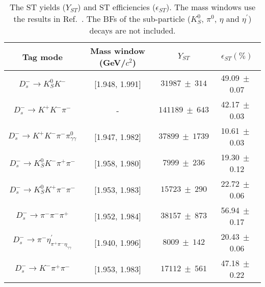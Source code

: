 \documentclass[aps,prd,twocolumn,showpacs,amsmath,amssymb]{revtex4-1}
\begin{document}
\begin{table*}[htbp]
    \caption{ The ST yields ($Y_{ST}$) and ST efficiencies ($\epsilon_{ST}$). 
    The mass windows use the results in Ref.~\cite{Doc-DB-630-v35}. 
The BFs of the sub-particle ($K_{S}^{0}$, $\pi^{0}$, $\eta$ and $\eta^{'}$) decays are not included.}
    \label{ST-eff}
    \begin{center}
        \begin{tabular}{cccc}
            \hline\hline
            Tag mode & Mass window (GeV/$c^{2}$)  & $Y_{ST}$  & $\epsilon_{ST}(\%)$\\
            \hline
            $D_{s}^{-} \rightarrow K_{S}^{0}K^{-}$                          & [1.948, 1.991]    & $31987\ \pm\ 314$               & 49.09$\ \pm\ $0.07\\
            $D_{s}^{-} \rightarrow K^{+}K^{-}\pi^{-}$                       & -                 & $141189\ \pm\ 643$              & 42.17$\ \pm\ $0.03\\
            $D_{s}^{-} \rightarrow K^{+}K^{-}\pi^{-}\pi^{0}_{\gamma\gamma}$                & [1.947, 1.982]    & $37899\ \pm\ 1739$              & 10.61$\ \pm\ $0.03\\
            $D_{s}^{-} \rightarrow K_{S}^{0}K^{-}\pi^{+}\pi^{-}$            & [1.958, 1.980]    & $7999\ \pm\ 236$               & 19.30$\ \pm\ $0.12\\
            $D_{s}^{-} \rightarrow K_{S}^{0}K^{+}\pi^{-}\pi^{-}$            & [1.953, 1.983]    & $15723\ \pm\ 290$               & 22.72$\ \pm\ $0.06\\
            $D_{s}^{-} \rightarrow \pi^{-}\pi^{-}\pi^{+}$                   & [1.952, 1.984]    & $38157\ \pm\ 873$              & 56.94$\ \pm\ $0.17\\
            $D_{s}^{-} \rightarrow \pi^{-}\eta_{\pi^{+}\pi^{-}\eta_{\gamma\gamma}}^{'}$          & [1.940, 1.996]    & $8009\ \pm\ 142$               & 20.43$\ \pm\ $0.06\\
            $D_{s}^{-} \rightarrow K^{-}\pi^{+}\pi^{-}$                     & [1.953, 1.983]    & $17112\ \pm\ 561$               & 47.18$\ \pm\ $0.22\\
            \hline\hline
        \end{tabular}
    \end{center}
\end{table*}
\end{document}
